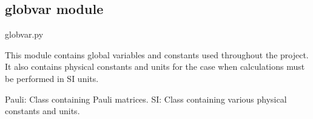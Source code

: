 \documentclass[letterpaper,10pt,english]{sphinxmanual}
\begin{document}
\sphinxstepscope


\subsection{globvar module}
\label{\detokenize{source/globvar:module-globvar}}\label{\detokenize{source/globvar:globvar-module}}\label{\detokenize{source/globvar::doc}}
\sphinxAtStartPar
globvar.py

\sphinxAtStartPar
This module contains global variables and constants used throughout the project.
It also contains physical constants and units for the case when calculations must be performed in SI units.
\begin{description}
\sphinxAtStartPar
Pauli: Class containing Pauli matrices.
SI: Class containing various physical constants and units.

\end{description}

\end{document}
